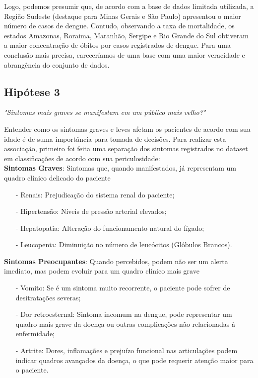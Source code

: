 \documentclass[a4paper, 12pt, twoside]{article}
\begin{document}
Logo, podemos presumir que, de acordo com a base de dados limitada utilizada, a Região Sudeste (destaque para Minas Gerais e São Paulo) apresentou o maior número de casos de dengue. Contudo, observando a taxa de mortalidade, os estados Amazonas, Roraima, Maranhão, Sergipe e Rio Grande do Sul obtiveram a maior concentração de óbitos por casos registrados de dengue. Para uma conclusão mais precisa, careceríamos de uma base com uma maior veracidade e abrangência do conjunto de dados.

\subsection{Hipótese 3}

\emph{"Sintomas mais graves se manifestam em um público mais velho?"}

Entender como os sintomas graves e leves afetam os pacientes de acordo com sua idade é de suma importância para tomada de decisões. Para realizar esta associação, primeiro foi feita uma separação dos sintomas registrados no dataset em classificações de acordo com sua periculosidade:
\vspace{0.5cm}
\\
\textbf{Sintomas Graves}: Sintomas que, quando manifestados, já representam um quadro clínico delicado do paciente
\begin{itemize}[nosep]
    \item[-] Renais: Prejudicação do sistema renal do paciente;
    \item[-] Hipertensão: Níveis de pressão arterial elevados;
    \item[-] Hepatopatia: Alteração do funcionamento natural do fígado;
    \item[-] Leucopenia: Diminuição no número de leucócitos (Glóbulos Brancos).
\end{itemize}
\vspace{0.5cm}
\textbf{Sintomas Preocupantes}: Quando percebidos, podem não ser um alerta imediato, mas podem evoluir para um quadro clínico mais grave
\begin{itemize}[nosep]
    \item[-] Vomito: Se é um sintoma muito recorrente, o paciente pode sofrer de desitratações severas;
    \item[-] Dor retroesternal: Sintoma incomum na dengue, pode representar um quadro mais grave da doença ou outras complicações não relacionadas à enfermidade;
    \item[-] Artrite: Dores, inflamações e prejuízo funcional nas articulações podem indicar quadros avançados da doença, o que pode requerir atenção maior para o paciente.
\end{itemize}
\end{document}
